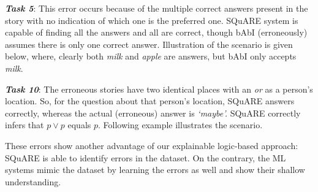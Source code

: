 \documentclass[letterpaper]{article}
\begin{document}
\noindent
\textit{\textbf{Task 5}}: This error occurs because of the multiple correct answers present in the story
with no indication of which one is the preferred one.
SQuARE system is capable of finding all the answers and all are correct, though bAbI (erroneously) assumes there is only one  correct answer. Illustration of the scenario is given below, where, clearly both \textit{milk} and \textit{apple} are answers, but bAbI only accepts \textit{milk}.

\smallskip
    \noindent
\cprotect {}

\medskip
\noindent\textit{\textbf{Task 10}}: The erroneous stories have two identical places with an \textit{or} as a person's location. So, for the question about that person's location, SQuARE answers correctly, whereas the actual (erroneous) answer is \textit{`maybe'.} SQuARE correctly infers that $p \vee p$ equals $p$. Following example illustrates the scenario.

    \smallskip\noindent
\cprotect {}

\smallskip
\noindent
These errors show another advantage of our  explainable logic-based approach: SQuARE is able to identify errors in the dataset. On the contrary, the ML systems mimic the dataset by learning the errors as well and show their shallow understanding.
\end{document}
